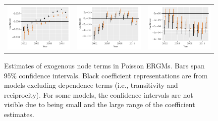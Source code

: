 \documentclass[reqno,onecolumn,letterpaper,12pt]{article}
\begin{document}
\begin{figure}[htp]
\begin{tabular}{@{\hskip -.05cm}c@{\hskip -.2cm}c@{\hskip -.2cm}c}
\includegraphics[height=.165\textheight, clip=true, trim=.5cm .5cm 0cm .1cm]{figures/main_rl_plots/Origin_GDPpc.pdf}   &
\includegraphics[height=.165\textheight, clip=true, trim=.5cm .5cm 0cm .1cm]{figures/main_rl_plots/Dest_TO.pdf} &
\includegraphics[height=.165\textheight, clip=true, trim=.5cm .5cm 0cm .1cm]{figures/main_rl_plots/Origin_TO.pdf}   \\


\end{tabular}
\caption{\label{fig:node_controls} Estimates of exogenous node terms in Poisson ERGMs. Bars span 95\% confidence intervals. Black coefficient representations are from models excluding dependence terms (i.e., transitivity and reciprocity). For some models, the confidence intervals are not visible due to being small and the large range of the coefficient estimates.}
\end{figure}
\end{document}
